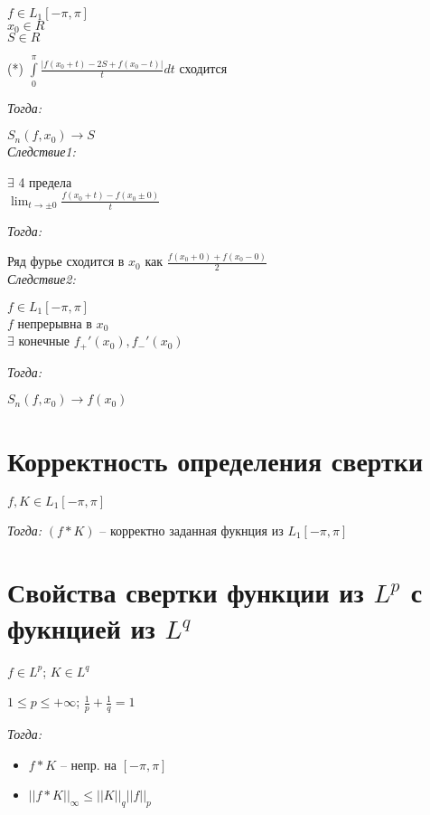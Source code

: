     $ f \in L_1[-\pi, \pi] $\\
    $ x_0 \in R $\\
    $ S \in R $

    (*) $ \int\limits_{0}^{\pi} \frac{|f(x_0 + t) - 2S + f(x_0 - t)|}{t} dt $ сходится

    \emph{Тогда:}

    $ S_n(f, x_0) \to S $\\

    \emph{Следствие1:}

    $ \exists $ 4 предела\\
    $ \lim_{t \to \pm 0} \frac{f(x_0 + t) - f(x_0 \pm 0)}{t} $

    \emph{Тогда:}

    Ряд фурье сходится в $ x_0 $ как $ \frac{f(x_0 + 0) + f(x_0 - 0)}{2} $\\

    \emph{Следствие2:}

    $ f \in L_1[-\pi, \pi] $\\
    $ f $ непрерывна в  $ x_0 $\\
    $ \exists $ конечные $ f_{+}'(x_0), f_{-}'(x_0) $

    \emph{Тогда:}

    $ S_n(f, x_0) \to f(x_0) $

    \section{Корректность определения свертки}

    $ f, K \in L_1[-\pi, \pi] $

    \emph{Тогда:} $ (f * K)$ -- корректно заданная фукнция из $ L_1[-\pi, \pi] $

    \section{Свойства свертки функции из $ L^p $ с фукнцией из $ L^q $}

    $ f \in L^p $; $ K \in L^q $

    $ 1 \leqslant p \leqslant +\infty $; $ \frac{1}{p} + \frac{1}{q} = 1 $

    \emph{Тогда:}
    \begin{itemize}
        \item $ f \ast K $ -- непр. на $ [-\pi, \pi] $
        \item $ ||f \ast K||_{\infty} \leqslant ||K||_q ||f||_p $
    \end{itemize}

